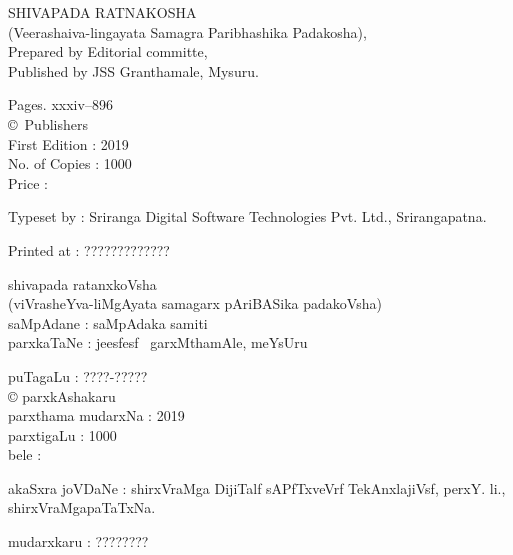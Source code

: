 \thispagestyle{empty}
\noindent
{\rm SHIVAPADA RATNAKOSHA}\\[5pt]
{\rm (Veerashaiva-lingayata Samagra Paribhashika Padakosha),}\\[4pt]
{\rm Prepared by Editorial committe,}\\[4pt]
{\rm Published by JSS Granthamale, Mysuru.}

\vspace{1cm}

\noindent
{\rm Pages. xxxiv--896}\\[7pt]
{\rm \copyright \ Publishers}\\[7pt]
{\rm First Edition : 2019}\\[7pt]
{\rm No. of Copies : 1000}\\[7pt]
{\rm Price :} \rupee

\bigskip

\noindent
{\rm Typeset by : Sriranga Digital Software Technologies Pvt. Ltd., Srirangapatna.}

\medskip

\noindent
{\rm Printed at : ?????????????}

\vfill

\noindent
{\large shivapada ratanxkoVsha}\\[5pt]
(viVrasheYva-liMgAyata samagarx pAriBASika padakoVsha)\\[5pt]
saMpAdane : saMpAdaka samiti\\[4pt]
parxkaTaNe : je{esf}{esf} \ garxMthamAle, meYsUru\\

\vspace{1cm}

\noindent
puTagaLu : ????-?????\\[3pt]
{\rm \copyright} parxkAshakaru\\[7pt]
parxthama mudarxNa : 2019\\[7pt]
parxtigaLu : 1000\\[10pt]
bele : \rupee

\bigskip

\noindent
akaSxra joVDaNe : shirxVraMga DijiTalf sAPfTxveVrf TekAnxlajiVsf, perxY. li., shirxVraMgapaTaTxNa.

\medskip

\noindent
mudarxkaru : ????????

\newpage

\thispagestyle{empty}

\phantom{a}

\vfill

